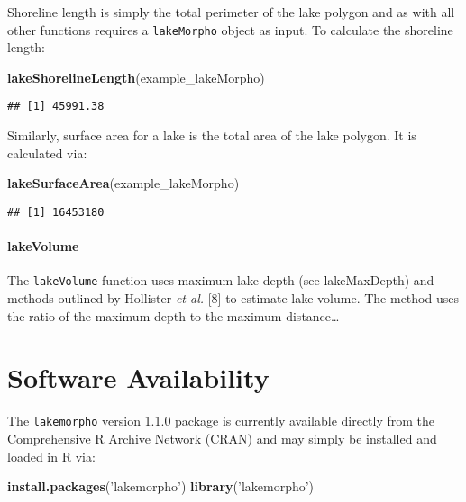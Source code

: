 \documentclass[11pt,]{article}
\newenvironment{Shaded}{\begin{snugshade}}{\end{snugshade}}
\newcommand{\KeywordTok}[1]{\textcolor[rgb]{0.13,0.29,0.53}{\textbf{{#1}}}}
\newcommand{\StringTok}[1]{\textcolor[rgb]{0.31,0.60,0.02}{{#1}}}
\newcommand{\NormalTok}[1]{{#1}}
\begin{document}
Shoreline length is simply the total perimeter of the lake polygon and
as with all other functions requires a \texttt{lakeMorpho} object as
input. To calculate the shoreline length:

\begin{Shaded}
\begin{Highlighting}[]
\KeywordTok{lakeShorelineLength}\NormalTok{(example_lakeMorpho)}
\end{Highlighting}
\end{Shaded}

\begin{verbatim}
## [1] 45991.38
\end{verbatim}

Similarly, surface area for a lake is the total area of the lake
polygon. It is calculated via:

\begin{Shaded}
\begin{Highlighting}[]
\KeywordTok{lakeSurfaceArea}\NormalTok{(example_lakeMorpho)}
\end{Highlighting}
\end{Shaded}

\begin{verbatim}
## [1] 16453180
\end{verbatim}

\paragraph{lakeVolume}\label{lakevolume}

The \texttt{lakeVolume} function uses maximum lake depth (see
lakeMaxDepth) and methods outlined by Hollister \emph{et al.} {[}8{]} to
estimate lake volume. The method uses the ratio of the maximum depth to
the maximum distance\ldots{}

\section{Software Availability}\label{software-availability}

The \texttt{lakemorpho} version 1.1.0 package is currently available
directly from the Comprehensive R Archive Network (CRAN) and may simply
be installed and loaded in R via:

\begin{Shaded}
\begin{Highlighting}[]
\KeywordTok{install.packages}\NormalTok{(}\StringTok{'lakemorpho'}\NormalTok{)}
\KeywordTok{library}\NormalTok{(}\StringTok{'lakemorpho'}\NormalTok{)}
\end{Highlighting}
\end{Shaded}
\end{document}
